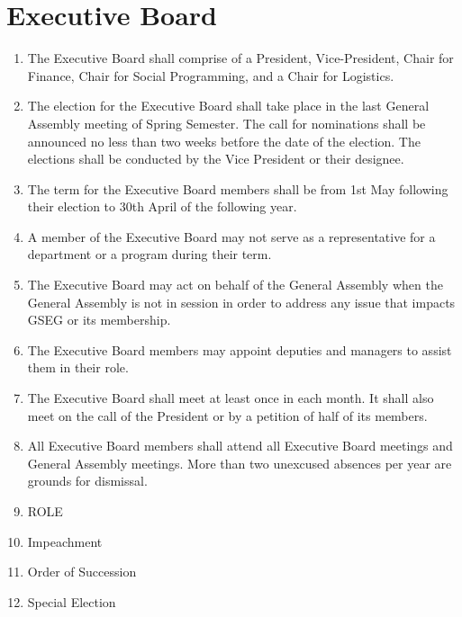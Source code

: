\chapter{Executive Board}
\label{art:exec}

\begin{enumerate}[label=\Alph*.]
\item The Executive Board shall comprise of a President, Vice-President, Chair for Finance, Chair
for Social Programming, and a Chair for Logistics.
\item The election for the Executive Board shall take place in the last General Assembly meeting of Spring Semester. The call for nominations shall be announced no less than two weeks betfore the
date of the election. The elections shall be conducted by the Vice President or their designee.
\item The term for the Executive Board members shall be from 1st May following their election to
30th April of the following year.  
\item A member of the Executive Board may not serve as a representative for a department or a
program during their term.
\item The Executive Board may act on behalf of the General Assembly when the General Assembly is
not in session in order to address any issue that impacts GSEG or its membership.
\item The Executive Board members may appoint deputies and managers to assist them in their role.

\item The Executive Board shall meet at least once in each month. It shall also meet on the call
of the President or by a petition of half of its members. 

\item All Executive Board members shall attend all Executive Board meetings and General Assembly
meetings. More than two unexcused absences per year are grounds for dismissal.

\item ROLE

\item Impeachment

\item Order of Succession

\item Special Election

\end{enumerate}


